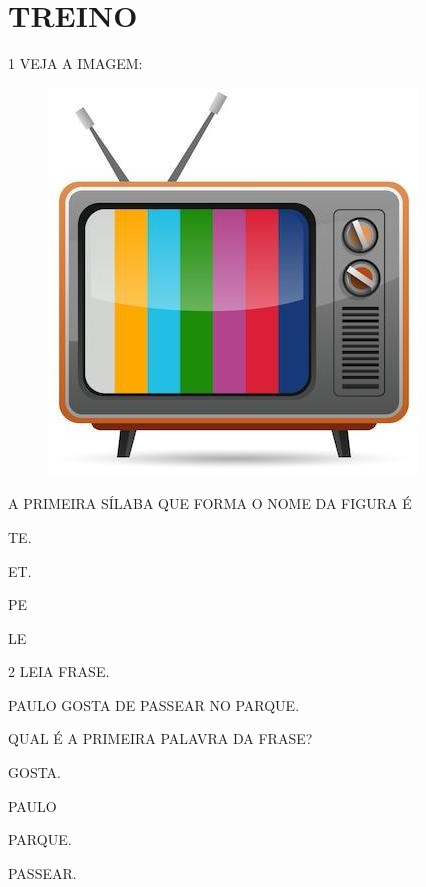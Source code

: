 
\section{TREINO}


\num{1} VEJA A IMAGEM:

\begin{figure}[htpb!]
\centering
\includegraphics[width=.6\textwidth]{media/image123.jpg}
\end{figure}

A PRIMEIRA SÍLABA QUE FORMA O NOME DA FIGURA É

\begin{escolha}
\item TE.

\item ET.

\item PE

\item LE
\end{escolha}

\pagebreak

\num{2} LEIA FRASE.

\begin{myquote}
PAULO GOSTA DE PASSEAR NO PARQUE.
\end{myquote}

QUAL É A PRIMEIRA PALAVRA DA FRASE?

\begin{escolha}
\item GOSTA.

\item PAULO

\item PARQUE.

\item PASSEAR.
\end{escolha}


